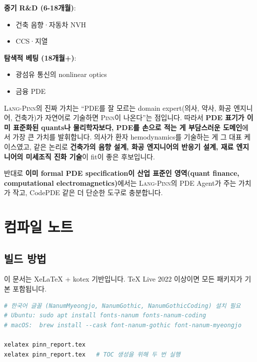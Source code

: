 \documentclass[11pt,a4paper,oneside]{report}
\newcommand{\pinn}{\textsc{Pinn}}
\newcommand{\langpinn}{\textsc{Lang-Pinn}}
\begin{document}
\textbf{중기 R\&D (6-18개월)}:
\begin{itemize}
\item 건축 음향·자동차 NVH
\item CCS·지열
\end{itemize}

\textbf{탐색적 베팅 (18개월+)}:
\begin{itemize}
\item 광섬유 통신의 nonlinear optics
\item 금융 PDE
\end{itemize}

\begin{infobox}
\langpinn{}의 진짜 가치는 ``PDE를 잘 모르는 domain expert(의사, 약사, 화공 엔지니어, 건축가)가 자연어로 기술하면 \pinn{}이 나온다''는 점입니다. 따라서 \textbf{PDE 표기가 이미 표준화된 quants나 물리학자보다, PDE를 손으로 적는 게 부담스러운 도메인}에서 가장 큰 가치를 발휘합니다. 의사가 환자 hemodynamics를 기술하는 게 그 대표 케이스였고, 같은 논리로 \textbf{건축가의 음향 설계, 화공 엔지니어의 반응기 설계, 재료 엔지니어의 미세조직 진화 기술}이 fit이 좋은 후보입니다.

반대로 \textbf{이미 formal PDE specification이 산업 표준인 영역(quant finance, computational electromagnetics)}에서는 \langpinn{}의 PDE Agent가 주는 가치가 작고, CodePDE 같은 더 단순한 도구로 충분합니다.
\end{infobox}

\appendix
\chapter{컴파일 노트}

\section{빌드 방법}

이 문서는 XeLaTeX + kotex 기반입니다. TeX Live 2022 이상이면 모든 패키지가 기본 포함됩니다.

\begin{lstlisting}[language=bash, caption={빌드 명령어}]
# 한국어 글꼴 (NanumMyeongjo, NanumGothic, NanumGothicCoding) 설치 필요
# Ubuntu: sudo apt install fonts-nanum fonts-nanum-coding
# macOS:  brew install --cask font-nanum-gothic font-nanum-myeongjo

xelatex pinn_report.tex
xelatex pinn_report.tex   # TOC 생성을 위해 두 번 실행
\end{lstlisting}
\end{document}
